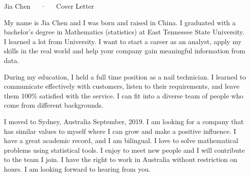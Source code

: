 \documentclass[11pt, a4paper]{awesome-cv}
\begin{document}
\makecvheader[R]

\makecvfooter
  {}
  {Jia Chen~~~·~~~Cover Letter}
  {}

\makelettertitlename

\begin{cvletter}


My name is Jia Chen and I was born and raised in China. I graduated with a bachelor’s degree in Mathematics (statistics) at East Tennessee State University. I learned a lot from University. I want to start a career as an analyst, apply my skills in the real world and help your company gain meaningful information from data. 

During my education, I held a full time position as a nail technician. I learned to communicate effectively with customers, listen to their requirements, and leave them 100\% satisfied with the service. I can fit into a diverse team of people who come from different backgrounds. 

I moved to Sydney, Australia September, 2019. I am looking for a company that has similar values to myself where I can grow and make a positive influence. I have a great academic record, and I am bilingual. I love to solve mathematical problems using statistical tools. I enjoy to meet new people and I will contribute to the team I join. I have the right to work in Australia without restriction on hours. I am looking forward to hearing from you.
\end{cvletter}


\makeletterclosing
\end{document}
